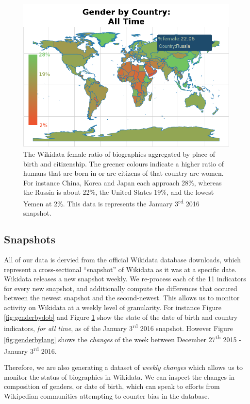 \documentclass{sig-alternate-05-2015}
\begin{document}
\begin{figure}
\includegraphics[width=\columnwidth]{figures/genderbycountry.png} 
\caption{The Wikidata female ratio of biographies aggregated by place of birth and citizenship. The greener colours indicate a higher ratio of humans that are born-in or are citizens-of that country are women. For instance China, Korea and Japan each approach 28\%, whereas the Russia is about 22\%, the United States 19\%, and the lowest Yemen at 2\%. This data is represents the January 3\textsuperscript{rd} 2016 snapshot.}
\label{fig:genderbycountry}
\end{figure}


\subsection{Snapshots}
All of our data is dervied from the official Wikidata database downloads, which represent a cross-sectional ``snapshot'' of Wikidata as it was at a specific date. Wikidata releases a new snapshot weekly. We re-process each of the 11 indicators for every new snapshot, and additionally compute the differences that occured between the newest snapshot and the second-newest. This allows us to monitor activity on Wikidata at a weekly level of granularity. For instance Figure  \ref{fig:genderbydob} and Figure \ref{fig:genderbycountry} show the state of the date of birth and country indicators, \textit{for all time}, as of the January 3\textsuperscript{rd} 2016 snapshot. However Figure \ref{fig:genderbylang} shows the \textit{changes} of the week between December 27\textsuperscript{th} 2015 - January 3\textsuperscript{rd} 2016.

Therefore, we are also generating a dataset of \textit{weekly changes} which allows us to monitor the status of biographies in Wikidata. We can inspect the changes in composition of genders, or date of birth, which can speak to efforts from Wikipedian communities attempting to counter bias in the database. 
\end{document}
